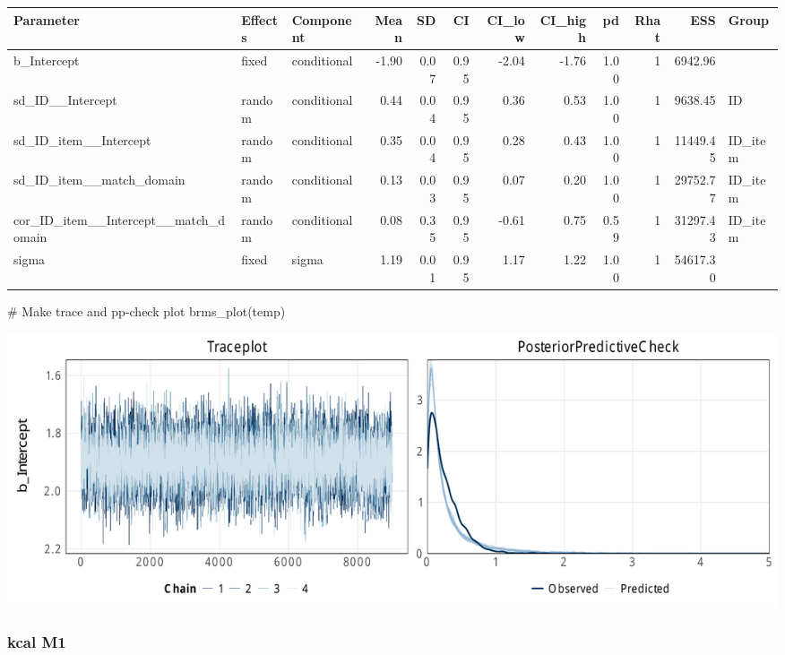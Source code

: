 \documentclass[
  letterpaper,
  DIV=11,
  numbers=noendperiod]{scrartcl}
\newenvironment{Shaded}{\begin{snugshade}}{\end{snugshade}}
\newcommand{\AttributeTok}[1]{\textcolor[rgb]{0.40,0.45,0.13}{#1}}
\newcommand{\CommentTok}[1]{\textcolor[rgb]{0.37,0.37,0.37}{#1}}
\newcommand{\FunctionTok}[1]{\textcolor[rgb]{0.28,0.35,0.67}{#1}}
\newcommand{\NormalTok}[1]{\textcolor[rgb]{0.00,0.23,0.31}{#1}}
\newcommand{\OtherTok}[1]{\textcolor[rgb]{0.00,0.23,0.31}{#1}}
\newcommand{\SpecialCharTok}[1]{\textcolor[rgb]{0.37,0.37,0.37}{#1}}
\newcommand{\StringTok}[1]{\textcolor[rgb]{0.13,0.47,0.30}{#1}}
\begin{document}
\begin{longtable*}[t]{lllrrrrrrrrl}
\toprule
Parameter & Effects & Component & Mean & SD & CI & CI\_low & CI\_high & pd & Rhat & ESS & Group\\
\midrule
b\_Intercept & fixed & conditional & -1.90 & 0.07 & 0.95 & -2.04 & -1.76 & 1.00 & 1 & 6942.96 & \\
sd\_ID\_\_Intercept & random & conditional & 0.44 & 0.04 & 0.95 & 0.36 & 0.53 & 1.00 & 1 & 9638.45 & ID\\
sd\_ID\_item\_\_Intercept & random & conditional & 0.35 & 0.04 & 0.95 & 0.28 & 0.43 & 1.00 & 1 & 11449.45 & ID\_item\\
sd\_ID\_item\_\_match\_domain & random & conditional & 0.13 & 0.03 & 0.95 & 0.07 & 0.20 & 1.00 & 1 & 29752.77 & ID\_item\\
cor\_ID\_item\_\_Intercept\_\_match\_domain & random & conditional & 0.08 & 0.35 & 0.95 & -0.61 & 0.75 & 0.59 & 1 & 31297.43 & ID\_item\\
\addlinespace
sigma & fixed & sigma & 1.19 & 0.01 & 0.95 & 1.17 & 1.22 & 1.00 & 1 & 54617.30 & \\
\bottomrule
\end{longtable*}

\begin{Shaded}
\begin{Highlighting}[]
\CommentTok{\# Make trace and pp{-}check plot}
\FunctionTok{brms\_plot}\NormalTok{(temp)}
\end{Highlighting}
\end{Shaded}

\includegraphics{supplement_files/figure-pdf/h1aM0kcal-1.pdf}

\subsubsection{kcal M1}\label{kcal-m1}

\begin{Shaded}
\end{Shaded}
\end{document}
